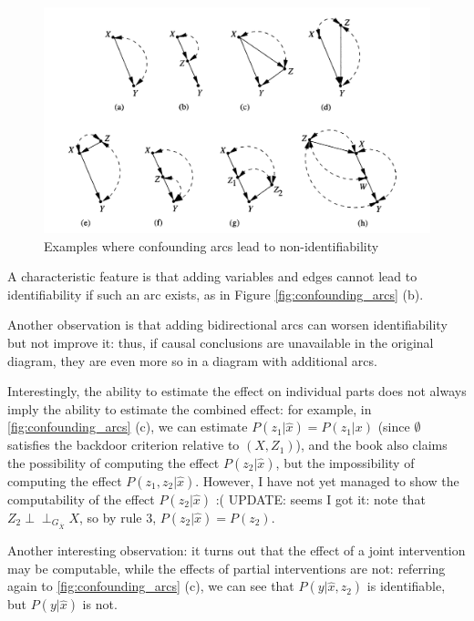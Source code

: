 \documentclass[fleqn]{article}
\newcommand{\independent}{\perp \!\!\! \perp}
\numberwithin{equation}{section}
\numberwithin{theorem}{section}
\numberwithin{figure}{section}
\numberwithin{lemma}{section}
\numberwithin{corollary}{section}
\begin{document}
\begin{figure}[h!]
	\begin{center}
		\includegraphics[scale=0.5]{imgs/img25.png}
	\end{center}
	\caption{Examples where confounding arcs lead to non-identifiability}
	\label{fig:confounding_arcs2}
\end{figure}

A characteristic feature is that adding variables and edges cannot lead to identifiability if such an arc exists, as in Figure \ref{fig:confounding_arcs} (b).

Another observation is that adding bidirectional arcs can worsen identifiability but not improve it: thus, if causal conclusions are unavailable in the original diagram, they are even more so in a diagram with additional arcs.

Interestingly, the ability to estimate the effect on individual parts does not always imply the ability to estimate the combined effect: for example, in \ref{fig:confounding_arcs} (c), we can estimate $P(z_1|\hat x) = P(z_1|x)$ (since $\emptyset$ satisfies the backdoor criterion relative to $(X, Z_1)$), and the book also claims the possibility of computing the effect $P(z_2|\hat x)$, but the impossibility of computing the effect $P(z_1, z_2 | \hat x)$. However, I have not yet managed to show the computability of the effect $P(z_2|\hat x)$ :(
UPDATE: seems I got it: note that $Z_2 \independent_{G_{\overline X}} X$, so by rule 3, $P(z_2 | \hat x) = P(z_2)$.

Another interesting observation: it turns out that the effect of a joint intervention may be computable, while the effects of partial interventions are not: referring again to \ref{fig:confounding_arcs} (c), we can see that $P(y|\hat x, \hat z_2)$ is identifiable, but $P(y|\hat x)$ is not.
\end{document}
